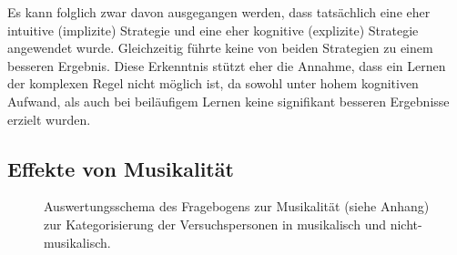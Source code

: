 \documentclass[doc,a4paper,12pt]{apa6}
\begin{document}
Es kann folglich zwar davon ausgegangen werden, dass tatsächlich eine eher intuitive (implizite) Strategie und eine eher kognitive (explizite) Strategie angewendet wurde. Gleichzeitig führte keine von beiden Strategien zu einem besseren Ergebnis. Diese Erkenntnis stützt eher die Annahme, dass ein Lernen der komplexen Regel nicht möglich ist, da sowohl unter hohem kognitiven Aufwand, als auch bei beiläufigem  Lernen keine signifikant besseren Ergebnisse erzielt wurden.

\subsection{Effekte von Musikalität}

\begin{figure}[t]
  \centering
  \begin{minipage}{\textwidth}
    \vspace{10pt}
    \caption{Auswertungsschema des Fragebogens zur Musikalität (siehe Anhang) zur Kategorisierung der Versuchspersonen in musikalisch und nicht-musikalisch.}
    \label{musik:aufbau}
  \end{minipage}
\end{figure}
\end{document}
